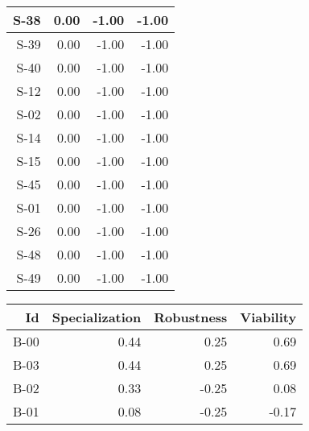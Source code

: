 \begin{tabular}{ | r | r | r | r | }
    \hline
                  S-38  &            0.00  &           -1.00  &           -1.00  \\
    \hline
                  S-39  &            0.00  &           -1.00  &           -1.00  \\
    \hline
                  S-40  &            0.00  &           -1.00  &           -1.00  \\
    \hline
                  S-12  &            0.00  &           -1.00  &           -1.00  \\
    \hline
                  S-02  &            0.00  &           -1.00  &           -1.00  \\
    \hline
                  S-14  &            0.00  &           -1.00  &           -1.00  \\
    \hline
                  S-15  &            0.00  &           -1.00  &           -1.00  \\
    \hline
                  S-45  &            0.00  &           -1.00  &           -1.00  \\
    \hline
                  S-01  &            0.00  &           -1.00  &           -1.00  \\
    \hline
                  S-26  &            0.00  &           -1.00  &           -1.00  \\
    \hline
                  S-48  &            0.00  &           -1.00  &           -1.00  \\
    \hline
                  S-49  &            0.00  &           -1.00  &           -1.00  \\
    \hline
\end{tabular}


\begin{tabular}{ | r | r | r | r | }
    \hline
                    Id  &  Specialization  &      Robustness  &       Viability  \\
    \hline
    \hline
                  B-00  &            0.44  &            0.25  &            0.69  \\
    \hline
                  B-03  &            0.44  &            0.25  &            0.69  \\
    \hline
                  B-02  &            0.33  &           -0.25  &            0.08  \\
    \hline
                  B-01  &            0.08  &           -0.25  &           -0.17  \\
    \hline
\end{tabular}


